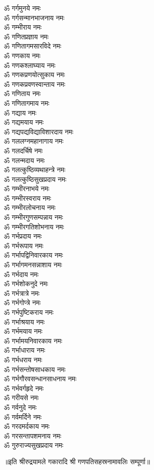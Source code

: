 \begin{multicols}{2}
\begin{flushleft}
ॐ गर्गमुनये नमः\\
ॐ गर्गसन्मानभाजनाय नमः\\
ॐ गम्भीराय नमः\\
ॐ गणितप्रज्ञाय नमः\\
ॐ गणितागमसारविदे नमः\\
ॐ गणकाय नमः\\
ॐ गणकश्लाघ्याय नमः\hfill{}\\
ॐ गणकप्रणयोत्सुकाय नमः\\
ॐ गणकप्रवणस्वान्ताय नमः\\
ॐ गणिताय नमः\\
ॐ गणितागमाय नमः\\
ॐ गद्याय नमः\\
ॐ गद्यमयाय नमः\\
ॐ गद्यपद्यविद्याविशारदाय नमः\\
ॐ गललग्नमहानागाय नमः\\
ॐ गलदर्चिषे नमः\\
ॐ गलन्मदाय नमः\hfill{}\\
ॐ गलत्कुष्ठिव्यथाहन्त्रे नमः\\
ॐ गलत्कुष्ठिसुखप्रदाय नमः\\
ॐ गम्भीरनाभये नमः\\
ॐ गम्भीरस्वराय नमः\\
ॐ गम्भीरलोचनाय नमः\\
ॐ गम्भीरगुणसम्पन्नाय नमः\\
ॐ गम्भीरगतिशोभनाय नमः\\
ॐ गर्भप्रदाय नमः\\
ॐ गर्भरूपाय नमः\\
ॐ गर्भापद्विनिवारकाय नमः\hfill{}\\
ॐ गर्भागमनसन्नाशाय नमः\\
ॐ गर्भदाय नमः\\
ॐ गर्भशोकनुदे नमः\\
ॐ गर्भत्रात्रे नमः\\
ॐ गर्भगोप्त्रे नमः\\
ॐ गर्भपुष्टिकराय नमः\\
ॐ गर्भाश्रयाय नमः\\
ॐ गर्भमयाय नमः\\
ॐ गर्भामयनिवारकाय नमः\\
ॐ गर्भाधाराय नमः\hfill{}\\
ॐ गर्भधराय नमः\\
ॐ गर्भसन्तोषसाधकाय नमः\\
ॐ गर्भगौरवसन्धानसाधनाय नमः\\
ॐ गर्भवर्गहृदे नमः\\
ॐ गरीयसे नमः\\
ॐ गर्वनुदे नमः\\
ॐ गर्वमर्दिने नमः\\
ॐ गरदमर्दकाय नमः\\
ॐ गरसन्तापशमनाय नमः\\
ॐ गुरुराज्यसुखप्रदाय नमः\hfill{}\\
\end{flushleft}
\end{multicols}
\centerline{॥इति श्रीरुद्रयामले गकारादि श्री गणपतिसहस्रनामावलिः सम्पूर्णा॥}
